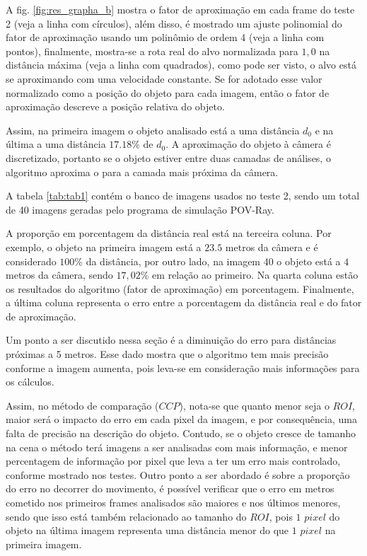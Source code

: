 A fig. \ref{fig:res_grapha_b} mostra o fator de aproximação em cada frame 
do teste 2 (veja a linha com círculos),
além disso, é mostrado um ajuste polinomial do fator de aproximação usando 
um polinômio de ordem 4 (veja a linha com pontos),
finalmente, mostra-se a rota real do alvo normalizada para $1,0$ na 
distância máxima (veja a linha com quadrados),
como pode ser visto, o alvo está se aproximando com uma velocidade constante.
Se for adotado esse valor normalizado como a posição do objeto para cada imagem, então o fator de aproximação
descreve a posição relativa do objeto.

Assim, na primeira imagem o objeto analisado está a uma distância $d_0$
e na última a uma distância $17.18\%$ de $d_0$.
A aproximação do objeto à câmera é discretizado, portanto se o objeto
estiver entre duas camadas de análises, o algoritmo aproxima o para
a camada mais próxima da câmera.

A tabela \ref{tab:tab1} contém o banco de imagens usados no teste 2, sendo um total de 40 imagens geradas
pelo programa de simulação POV-Ray.

A proporção em porcentagem da distância real está na terceira coluna. Por exemplo, o objeto na primeira imagem
está a $23.5$ metros da câmera e é considerado $100$\% da distância, por outro lado, na imagem 40 o objeto está a
$4$ metros da câmera, sendo $17,02$\% em relação ao primeiro. Na quarta coluna estão os resultados do algoritmo (fator
de aproximação) em porcentagem. Finalmente, a última coluna representa o erro entre a porcentagem da distância real e do
fator de aproximação.

Um ponto a ser discutido nessa seção é a diminuição do erro para distâncias próximas a 5 metros. Esse dado 
mostra que o algoritmo tem mais precisão conforme a imagem aumenta, pois leva-se em consideração mais informações
para os cálculos.

Assim, no método de comparação ($CCP$), nota-se que quanto menor seja o $ROI$, 
maior será o impacto do erro em cada pixel da imagem, 
e por consequência, uma falta de precisão na descrição do objeto. Contudo, se o objeto cresce de tamanho na cena
o método terá imagens a ser analisadas com mais informação, e menor percentagem de informação por pixel
que leva a ter um erro mais controlado, conforme
mostrado nos testes. Outro ponto a ser abordado é sobre a proporção do erro no decorrer do movimento, é possível
verificar que o erro em metros cometido nos primeiros frames analisados são maiores e nos últimos menores, sendo que
isso está também relacionado ao tamanho do $ROI$, pois $1$ $pixel$ do objeto na última imagem representa uma distância
menor do que $1$ $pixel$ na primeira imagem. 

